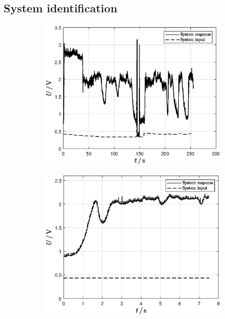 \newpage

\subsection{System identification} \label{appendix:systemidentification}
\FloatBarrier
\begin{figure}[ht]
    \centering
    \begin{subfigure}[b]{0.45\textwidth}
    \includegraphics[width=\textwidth]{figure/raw.eps}
    \caption{}
    \label{subfig:raw}
    \end{subfigure}
    \begin{subfigure}[b]{0.45\textwidth}
    \includegraphics[width=\textwidth]{figure/trimming.eps}
    \caption{}
    \label{subfig:trimming}
    \end{subfigure}


\end{figure}
